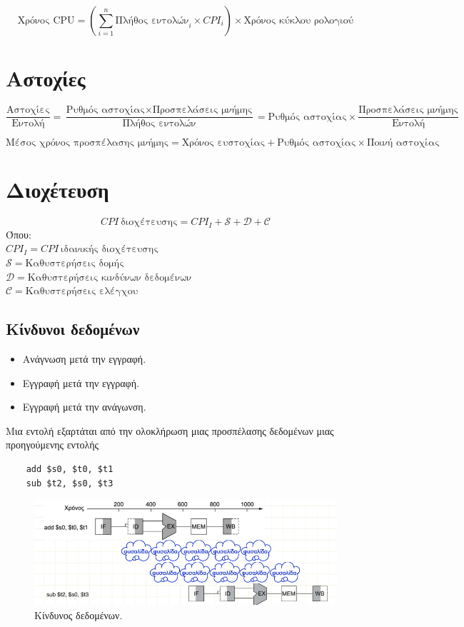 \documentclass[11pt, oneside]{article}   	%
\begin{document}
\[\text{Χρόνος CPU} = \left(\sum_{i=1}^n \text{Πλήθος εντολών}_i \times CPI_i \right) \times \text{Χρόνος κύκλου ρολογιού}\]

\section{Αστοχίες}

\[\frac{\text{Αστοχίες}}{\text{Εντολή}} = \frac{\text{Ρυθμός αστοχίας} \times \text{Προσπελάσεις μνήμης}}{\text{Πλήθος εντολών}} = \text{Ρυθμός αστοχίας} \times \frac{\text{Προσπελάσεις μνήμης}}{\text{Εντολή}} \]

\[\text{Μέσος χρόνος προσπέλασης μνήμης} = \text{Χρόνος ευστοχίας} + \text{Ρυθμός αστοχίας} \times \text{Ποινή αστοχίας}\]

\section{Διοχέτευση}

\[CPI \ \text{διοχέτευσης} = CPI_I  + \mathcal{S} + \mathcal{D} + \mathcal{C}\]
Όπου: \\
$CPI_I = CPI \ \text{ιδανικής διοχέτευσης}$ \\
$\mathcal{S} = \text{Καθυστερήσεις δομής}$ \\
$\mathcal{D} = \text{Καθυστερήσεις κινδύνων δεδομένων}$ \\
$\mathcal{C} = \text{Καθυστερήσεις ελέγχου}$

\subsection{Κίνδυνοι δεδομένων}
\begin{itemize}
	\item Ανάγνωση μετά την εγγραφή.
	\item Εγγραφή μετά την εγγραφή.
	\item Εγγραφή μετά την ανάγωνση.
\end{itemize}

Μια εντολή εξαρτάται από την ολοκλήρωση μιας
προσπέλασης δεδομένων μιας προηγούμενης
εντολής

\begin{lstlisting}
	add $s0, $t0, $t1
	sub $t2, $s0, $t3
\end{lstlisting}

\begin{figure}[h!]
	\centering
	\includegraphics[width=0.7\linewidth]{"Computer Architecture 2/screenshot001"}
	\caption{Κίνδυνος δεδομένων.}
	\label{fig:screenshot001}
\end{figure}
\end{document}
